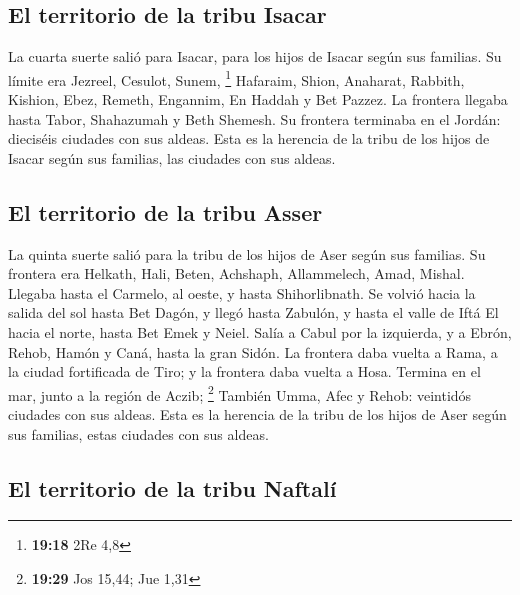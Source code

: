 \hypertarget{el-territorio-de-la-tribu-isacar}{%
\subsection{El territorio de la tribu
Isacar}\label{el-territorio-de-la-tribu-isacar}}

 La cuarta suerte salió para Isacar, para los hijos de
Isacar según sus familias.  Su límite era Jezreel,
Cesulot, Sunem, \footnote{\textbf{19:18} 2Re 4,8} 
Hafaraim, Shion, Anaharat,  Rabbith, Kishion, Ebez,
 Remeth, Engannim, En Haddah y Bet Pazzez.
 La frontera llegaba hasta Tabor, Shahazumah y Beth
Shemesh. Su frontera terminaba en el Jordán: dieciséis ciudades con sus
aldeas.  Esta es la herencia de la tribu de los hijos de
Isacar según sus familias, las ciudades con sus aldeas.

\hypertarget{el-territorio-de-la-tribu-asser}{%
\subsection{El territorio de la tribu
Asser}\label{el-territorio-de-la-tribu-asser}}

 La quinta suerte salió para la tribu de los hijos de
Aser según sus familias.  Su frontera era Helkath, Hali,
Beten, Achshaph,  Allammelech, Amad, Mishal. Llegaba
hasta el Carmelo, al oeste, y hasta Shihorlibnath.  Se
volvió hacia la salida del sol hasta Bet Dagón, y llegó hasta Zabulón, y
hasta el valle de Iftá El hacia el norte, hasta Bet Emek y Neiel. Salía
a Cabul por la izquierda,  y a Ebrón, Rehob, Hamón y
Caná, hasta la gran Sidón.  La frontera daba vuelta a
Rama, a la ciudad fortificada de Tiro; y la frontera daba vuelta a Hosa.
Termina en el mar, junto a la región de Aczib; \footnote{\textbf{19:29}
  Jos 15,44; Jue 1,31}  También Umma, Afec y Rehob:
veintidós ciudades con sus aldeas.  Esta es la herencia
de la tribu de los hijos de Aser según sus familias, estas ciudades con
sus aldeas.

\hypertarget{el-territorio-de-la-tribu-naftaluxed}{%
\subsection{El territorio de la tribu
Naftalí}\label{el-territorio-de-la-tribu-naftaluxed}}

